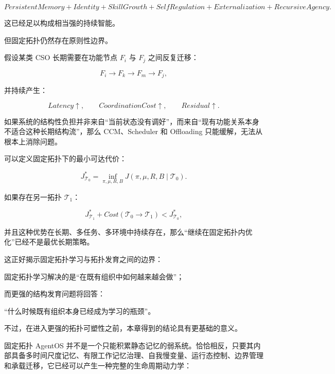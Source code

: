 \[
\boxed{
PersistentMemory
+
Identity
+
SkillGrowth
+
SelfRegulation
+
Externalization
+
RecursiveAgency.
}
\]

这已经足以构成相当强的持续智能。

但固定拓扑仍然存在原则性边界。

假设某类 CSO 长期需要在功能节点 $F_i$ 与 $F_j$ 之间反复迁移：

\[
F_i
\rightarrow
F_k
\rightarrow
F_m
\rightarrow
F_j,
\]

并持续产生：

\[
Latency\uparrow,
\qquad
CoordinationCost\uparrow,
\qquad
Residual\uparrow.
\]

如果系统的结构性负担并非来自“当前状态没有调好”，而来自“现有功能关系本身不适合这种长期结构流”，那么 CCM、Scheduler 和 Offloading 只能缓解，无法从根本上消除问题。

可以定义固定拓扑下的最小可达代价：

\[
J_{\mathcal{T}_0}^{*}
=
\inf_{\pi,\mu,R,B}
J
(
\pi,\mu,R,B
\mid
\mathcal{T}_0
).
\]

如果存在另一拓扑 $\mathcal{T}_1$：

\[
J_{\mathcal{T}_1}^{*}
+
Cost(\mathcal{T}_0\rightarrow\mathcal{T}_1)
<
J_{\mathcal{T}_0}^{*},
\]

并且这种优势在长期、多任务、多环境中持续存在，那么“继续在固定拓扑内优化”已经不是最优长期策略。

这正好揭示固定拓扑学习与拓扑发育之间的边界：

\begin{remark}
固定拓扑学习解决的是“在既有组织中如何越来越会做”；
\end{remark}

而更强的结构发育问题将回答：

\begin{statementbox}
“什么时候既有组织本身已经成为学习的瓶颈”。
\end{statementbox}

不过，在进入更强的拓扑可塑性之前，本章得到的结论具有更基础的意义。

固定拓扑 AgentOS 并不是一个只能积累静态记忆的弱系统。恰恰相反，只要其内部具备多时间尺度记忆、有限工作记忆治理、自我慢变量、运行态控制、边界管理和承载迁移，它已经可以产生一种完整的生命周期动力学：

\begin{statementbox}
\centering
{}
\end{statementbox}

